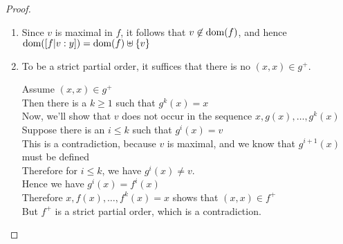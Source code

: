 \begin{proof}
\begin{enumerate}
\item Since $v$ is maximal in $f$, it follows that $v \not\in \mbox{dom}({f})$, and hence $\mbox{dom}({[f|v:y]}) = \mbox{dom}({f}) \uplus \{{v}\}$

\item To be a strict partial order, it suffices that there is no $(x,x) \in g^+$. 
\begin{tabbedproof}
\oo Assume $(x, x) \in g^+$ \\
\oo Then there is a $k \geq 1$ such that $g^k(x) = x$ \\
\oo Now, we'll show that $v$ does not occur in the sequence $x, g(x), \ldots, g^k(x)$ \\
\ooo Suppose there is an $i \leq k$ such that $g^i(x) = v$ \\
\ooo This is a contradiction, because $v$ is maximal, and we know that $g^{i+1}(x)$ must be defined \\
\oo Therefore for $i \leq k$, we have $g^i(x) \not= v$.  \\
\oo Hence we have $g^i(x) = f^i(x)$ \\
\oo Therefore $x, f(x), \ldots, f^k(x) = x$ shows that $(x, x) \in f^+$ \\
\oo But $f^+$ is a strict partial order, which is a contradiction. \\
\end{tabbedproof}


\end{enumerate}
\end{proof}
